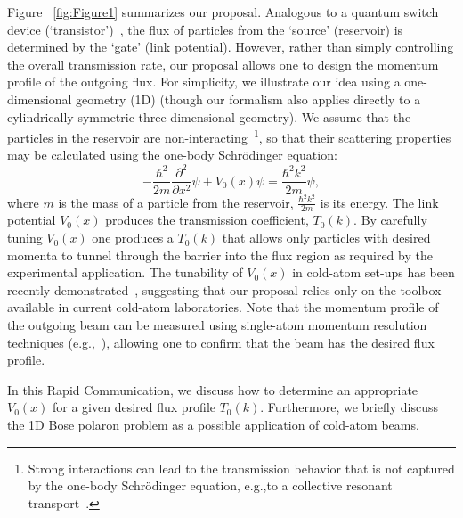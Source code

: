 \documentclass[twocolumn,amsmath,amssymb,showpacs,pra,superscriptaddress,aps]{revtex4-1}
\begin{document}
Figure ~\ref{fig:Figure1} summarizes our proposal. Analogous to a quantum switch device (`transistor')~\cite{zoller2004, marchukov2016,thuberg2017}, the flux of particles from the `source' (reservoir) is determined by the `gate' (link potential). However, rather than simply controlling the overall transmission rate, our proposal allows one to design the momentum profile of the outgoing flux.
 For simplicity, we illustrate our idea using a one-dimensional geometry (1D) (though our formalism also applies directly to a cylindrically symmetric three-dimensional geometry). We assume that the particles in the reservoir are non-interacting~\footnote{Strong interactions can lead to the transmission behavior that is not captured by the one-body Schr{\"o}dinger equation, e.g.,to a collective resonant transport~\cite{Schlagheck2005}.}, so that their scattering properties may be calculated using the one-body Schr{\"o}dinger equation:
\begin{equation}
-\frac{\hbar^2}{2m}\frac{\partial^2}{\partial x^2}\psi+V_0(x)\psi=\frac{\hbar^2k^2}{2m}\psi,
\label{eq:schr}
\end{equation}
where $m$ is the mass of a particle from the reservoir, $\frac{\hbar^2k^2}{2m}$ is its energy. The link potential $V_0(x)$ produces the transmission coefficient, $T_0(k)$. By carefully tuning $V_0(x)$ one produces a $T_0(k)$ that allows only particles with desired momenta to tunnel through the barrier into the flux region as required by the experimental application. The tunability of $V_0(x)$ in cold-atom set-ups has been recently demonstrated~\cite{esslinger2015,esslinger2018,esslinger2019}, 
suggesting that our proposal relies only on the toolbox available in current cold-atom laboratories.
Note that the momentum profile of the outgoing beam can be measured using single-atom momentum resolution techniques (e.g.,~\cite{jochim2018}), allowing one to confirm that the beam has the desired flux profile.

In this Rapid Communication,  we discuss how to determine an appropriate $V_0(x)$ for a given desired flux profile $T_0(k)$. Furthermore, we briefly discuss the 1D Bose polaron problem as a possible application of cold-atom beams. 
\end{document}
